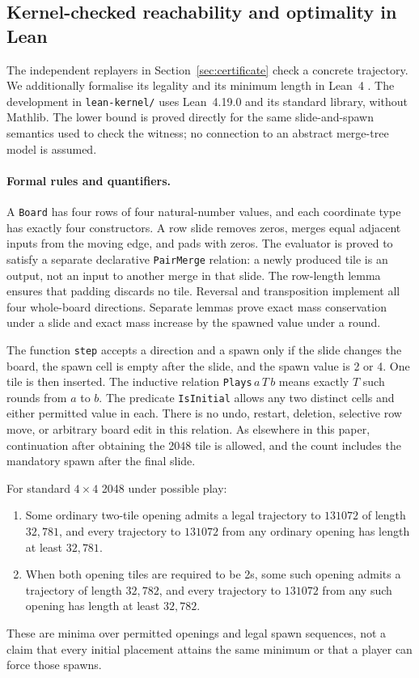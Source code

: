 \subsection{Kernel-checked reachability and optimality in Lean}\label{sec:lean}

The independent replayers in Section~\ref{sec:certificate} check a concrete
trajectory. We additionally formalise its legality and its minimum length
in Lean~4 \cite{demoura2021lean4}. The development in
\texttt{lean-kernel/} uses Lean~4.19.0 and its standard library, without
Mathlib. The lower bound is proved directly for the same slide-and-spawn
semantics used to check the witness; no connection to an abstract
merge-tree model is assumed.

\paragraph{Formal rules and quantifiers.}
A \texttt{Board} has four rows of four natural-number values, and each
coordinate type has exactly four constructors. A row slide removes zeros,
merges equal adjacent inputs from the moving edge, and pads with zeros.
The evaluator is proved to satisfy a separate declarative
\texttt{PairMerge} relation: a newly produced tile is an output, not an
input to another merge in that slide. The row-length lemma ensures that
padding discards no tile. Reversal and transposition implement all four
whole-board directions. Separate lemmas prove exact mass conservation
under a slide and exact mass increase by the spawned value under a round.

The function \texttt{step} accepts a direction and a spawn only if the
slide changes the board, the spawn cell is empty after the slide, and the
spawn value is 2 or 4. One tile is then inserted. The inductive relation
\texttt{Plays}\,$a\,T\,b$ means exactly $T$ such rounds from $a$ to $b$.
The predicate \texttt{IsInitial} allows any two distinct cells and either
permitted value in each. There is no undo, restart, deletion, selective
row move, or arbitrary board edit in this relation. As elsewhere in this
paper, continuation after obtaining the 2048 tile is allowed, and the
count includes the mandatory spawn after the final slide.

\begin{theorem}\label{thm:leanexact}
For standard $4\times4$ 2048 under possible play:
\begin{enumerate}[nosep,label=(\alph*)]
\item Some ordinary two-tile opening admits a legal trajectory to
$131072$ of length $32{,}781$, and every trajectory to $131072$ from
any ordinary opening has length at least $32{,}781$.
\item When both opening tiles are required to be 2s, some such opening
admits a trajectory of length $32{,}782$, and every trajectory to
$131072$ from any such opening has length at least $32{,}782$.
\end{enumerate}
These are minima over permitted openings and legal spawn sequences, not
a claim that every initial placement attains the same minimum or that a
player can force those spawns.
\end{theorem}

